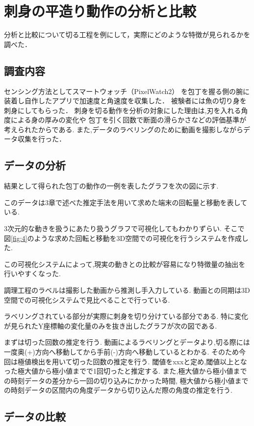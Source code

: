 \section{刺身の平造り動作の分析と比較}
分析と比較について切る工程を例にして，実際にどのような特徴が見られるかを調べた．
\subsection{調査内容}
センシング方法としてスマートウォッチ（PixelWatch2）
を包丁を握る側の腕に装着し自作したアプリで加速度と角速度を収集した．
被験者には魚の切り身を刺身にしてもらった．
刺身を切る動作を分析の対象にした理由は,刃を入れる角度による身の厚みの変化や
包丁を引く回数で断面の滑らかさなどの評価基準が考えられたからである.
また,データのラベリングのために動画を撮影しながらデータ収集を行った．
\subsection{データの分析}
結果として得られた包丁の動作の一例を表したグラフを次の図に示す.


このデータは3章で述べた推定手法を用いて求めた端末の回転量と移動を表している.

3次元的な動きを扱うにあたり扱うグラフで可視化してもわかりずらい.
そこで図\ref{fig:4}のような求めた回転と移動を3D空間での可視化を行うシステムを作成した.


この可視化システムによって,現実の動きとの比較が容易になり特徴量の抽出を行いやすくなった.

調理工程のラベルは撮影した動画から推測し手入力している.
動画との同期は3D空間での可視化システムで見比べることで行っている.

ラベリングされている部分が実際に刺身を切り分けている部分である.
特に変化が見られたY座標軸の変化量のみを抜き出したグラフが次の図である.


まずは切った回数の推定を行う.
動画によるラベリングとデータより,切る際には一度奥(+)方向へ移動してから手前(-)方向へ移動しているとわかる.
そのため今回は極値検出を用いて切った回数の推定を行う.
閾値をxxxと定め,閾値以上となった極大値から極小値までで1回切ったと推定する.
また,極大値から極小値までの時刻データの差分から一回の切り込みにかかった時間,
極大値から極小値までの時刻データの区間内の角度データから切り込んだ際の角度の推定を行う.

\subsection{データの比較}